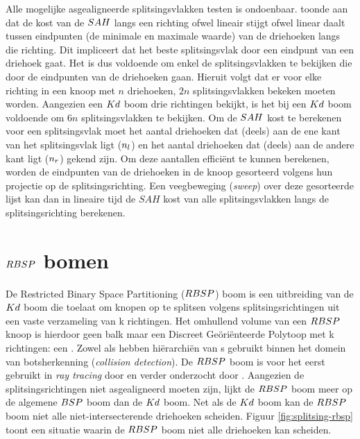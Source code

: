     Alle mogelijke asgealigneerde splitsingsvlakken testen is ondoenbaar. 
    \authorHavran{} \cite{havran2000heuristic} toonde aan dat de kost van de $SAH$ langs een richting ofwel lineair stijgt ofwel linear daalt tussen eindpunten (de minimale en maximale waarde) van de driehoeken langs die richting.
    Dit impliceert dat het beste splitsingsvlak door een eindpunt van een driehoek gaat.
    Het is dus voldoende om enkel de splitsingsvlakken te bekijken die door de eindpunten van de driehoeken gaan.
    Hieruit volgt dat er voor elke richting in een knoop met $n$ driehoeken, $2n$ splitsingsvlakken bekeken moeten worden.
    Aangezien een $Kd$ boom drie richtingen bekijkt, is het bij een $Kd$ boom voldoende om $6n$ splitsingsvlakken te bekijken.
    Om de $SAH$ kost te berekenen voor een splitsingsvlak moet het aantal driehoeken dat (deels) aan de ene kant van het splitsingsvlak ligt ($n_l$) en het aantal driehoeken dat (deels) aan de andere kant ligt ($n_r$) gekend zijn.
    Om deze aantallen efficiënt te kunnen berekenen, worden de eindpunten van de driehoeken in de knoop gesorteerd volgens hun projectie op de splitsingsrichting.
    Een veegbeweging (\textit{sweep}) over deze gesorteerde lijst kan dan in lineaire tijd de $SAH$ kost van alle splitsingsvlakken langs de splitsingsrichting berekenen.

\section{$RBSP$ bomen}
    De Restricted Binary Space Partitioning ($RBSP$) boom is een uitbreiding van de $Kd$ boom die toelaat om knopen op te splitsen volgens splitsingsrichtingen uit een vaste verzameling van k richtingen.
    Het omhullend volume van een $RBSP$ knoop is hierdoor geen balk maar een Discreet Geöriënteerde Polytoop met k richtingen: een \symKDOP.
    Zowel \authorKlosowki{} \cite{klosowski1998efficient} als \authorZachmann{} \cite{zachmann1998rapid} hebben hiërarchiën van \symKDOP s gebruikt binnen het domein van botsherkenning (\textit{collision detection}).
    De $RBSP$ boom is voor het eerst gebruikt in \textit{ray tracing} door \authorKammaje{} \cite{Kammaje} en verder onderzocht door \authorBudge{} \cite{Budge}.
    Aangezien de splitsingsrichtingen niet asgealigneerd moeten zijn, lijkt de $RBSP$ boom meer op de algemene $BSP$ boom dan de $Kd$ boom. Net als de $Kd$ boom kan de $RBSP$ boom niet alle niet-intersecterende driehoeken scheiden. 
    Figuur \ref{fig:splitsing-rbsp} toont een situatie waarin de $RBSP$ boom niet alle driehoeken kan scheiden.
    \\


